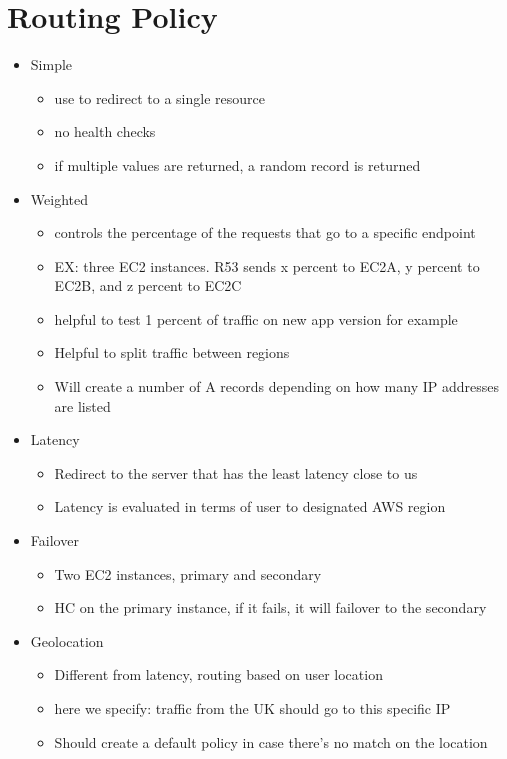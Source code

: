 \documentclass[]{scrartcl}
\begin{document}
\section{Routing Policy}
\begin{itemize}
	\item Simple
	\begin{itemize}
		\item use to redirect to a single resource
		\item no health checks
		\item if multiple values are returned, a random record is returned
	\end{itemize}
	\item Weighted
	\begin{itemize}
		\item controls the percentage of the requests that go to a specific endpoint
		\item EX: three EC2 instances. R53 sends x percent to EC2A, y percent to EC2B, and z percent to EC2C
		\item helpful to test 1 percent of traffic on new app version for example
		\item Helpful to split traffic between regions
		\item Will create a number of A records depending on how many IP addresses are listed
	\end{itemize}
	\item Latency
	\begin{itemize}
		\item Redirect to the server that has the least latency close to us
		\item Latency is evaluated in terms of user to designated AWS region
	\end{itemize}
	\item Failover
	\begin{itemize}
		\item Two EC2 instances, primary and secondary
		\item HC on the primary instance, if it fails, it will failover to the secondary
	\end{itemize}
	\item Geolocation
	\begin{itemize}
		\item Different from latency, routing based on user location
		\item here we specify: traffic from the UK should go to this specific IP
		\item Should create a default policy in case there's no match on the location

\end{itemize}
\end{itemize}
\end{document}
